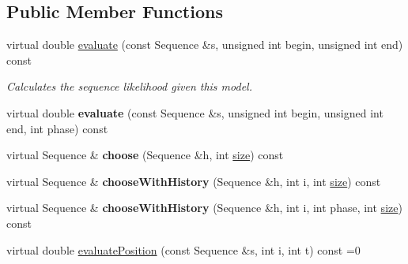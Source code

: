 \subsection*{Public Member Functions}
\begin{DoxyCompactItemize}
\item 
\mbox{\label{classtops_1_1InhomogeneousFactorableModel_a9e5804a829b9cbbc427f73562ad9a279}} 
virtual double \hyperlink{classtops_1_1InhomogeneousFactorableModel_a9e5804a829b9cbbc427f73562ad9a279}{evaluate} (const Sequence \&s, unsigned int begin, unsigned int end) const
\begin{DoxyCompactList}\small\item\em Calculates the sequence likelihood given this model. \end{DoxyCompactList}\item 
\mbox{\label{classtops_1_1InhomogeneousFactorableModel_a697921bf1b5e5800223ee81823e77dce}} 
virtual double {\bfseries evaluate} (const Sequence \&s, unsigned int begin, unsigned int end, int phase) const
\item 
\mbox{\label{classtops_1_1InhomogeneousFactorableModel_a6833422c79df88b45d45180c9ac3436c}} 
virtual Sequence \& {\bfseries choose} (Sequence \&h, int \hyperlink{classtops_1_1ProbabilisticModel_a4e3910e9b9b848b7078e7101909ae82a}{size}) const
\item 
\mbox{\label{classtops_1_1InhomogeneousFactorableModel_a761218d79449f5ebdedf2459a682c384}} 
virtual Sequence \& {\bfseries choose\+With\+History} (Sequence \&h, int i, int \hyperlink{classtops_1_1ProbabilisticModel_a4e3910e9b9b848b7078e7101909ae82a}{size}) const
\item 
\mbox{\label{classtops_1_1InhomogeneousFactorableModel_aa7390e7bfcda2dcedd3b1b751ebde767}} 
virtual Sequence \& {\bfseries choose\+With\+History} (Sequence \&h, int i, int phase, int \hyperlink{classtops_1_1ProbabilisticModel_a4e3910e9b9b848b7078e7101909ae82a}{size}) const
\item 
virtual double \hyperlink{classtops_1_1InhomogeneousFactorableModel_a977e9f2d49affc6beb74c68728a2be1f}{evaluate\+Position} (const Sequence \&s, int i, int t) const =0

\end{DoxyCompactItemize}
